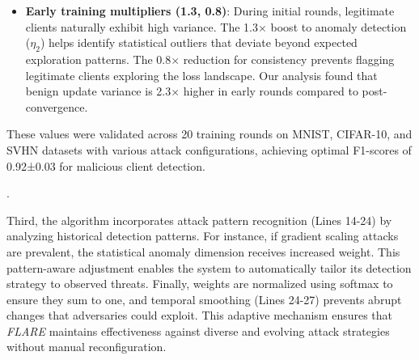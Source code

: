 \documentclass[lettersize,journal]{IEEEtran}
\begin{document}
{{\begin{itemize}[noitemsep,topsep=0pt,wide]
\item \textbf{Early training multipliers (1.3, 0.8)}: During initial rounds, legitimate clients naturally exhibit high variance. The 1.3$\times$ boost to anomaly detection ($\eta_2$) helps identify statistical outliers that deviate beyond expected exploration patterns. The 0.8$\times$ reduction for consistency prevents flagging legitimate clients exploring the loss landscape. Our analysis found that benign update variance is 2.3$\times$ higher in early rounds compared to post-convergence.
\end{itemize}
These values were validated across 20 training rounds on MNIST, CIFAR-10, and SVHN datasets with various attack configurations, achieving optimal F1-scores of 0.92±0.03 for malicious client detection.}.

Third, the algorithm incorporates attack pattern recognition (Lines 14-24) by analyzing historical detection patterns. For instance, if gradient scaling attacks are prevalent, the statistical anomaly dimension receives increased weight. This pattern-aware adjustment enables the system to automatically tailor its detection strategy to observed threats.
Finally, weights are normalized using softmax to ensure they sum to one, and temporal smoothing (Lines 24-27) prevents abrupt changes that adversaries could exploit. This adaptive mechanism ensures that \textit{FLARE} maintains effectiveness against diverse and evolving attack strategies without manual reconfiguration.



}
\end{document}
